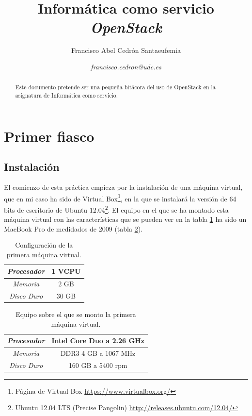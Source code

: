 \documentclass{article}
\title{\textbf{Informática como servicio}
\\ \textbf{\emph{OpenStack}}
}
\author{Francisco Abel Cedrón Santaeufemia \and \textit{francisco.cedron@udc.es}}
\date{} %
\begin{document}
\maketitle %
\renewcommand{\abstractname}{Abstract} %
\begin{abstract}
Este documento pretende ser una pequeña bitácora del uso de OpenStack en la asignatura de Informática como servicio.
\end{abstract}
\renewcommand{\contentsname}{} %
{\setlength{\parskip}{0mm} \tableofcontents} %

\section{Primer fiasco}

\subsection{Instalación}
	El comienzo de esta práctica empieza por la instalación de una máquina virtual, que en mi caso ha sido de Virtual Box\footnote{
	Página de Virtual Box \url{https://www.virtualbox.org/}}, en la que se instalará la versión de 64 bits de escritorio de Ubuntu 12.04\footnote{
	Ubuntu 12.04 LTS (Precise Pangolin) \url{http://releases.ubuntu.com/12.04/}}. El equipo en el que se ha montado esta máquina virtual con las características que se pueden ver en la tabla \ref{tab:VirtualMachine1Settings} ha sido un MacBook Pro de medidados de 2009 (tabla \ref{tab:MacBookProSettings}).

\begin{table}[h]
	\begin{center}
		\caption{Configuración de la primera máquina virtual.}
		\begin{tabular}{|c|c|}
\hline
\emph{Procesador} &
1 VCPU \\ \hline
\emph{Memoria} &
2 GB \\ \hline
\emph{Disco Duro} &
30 GB \\ \hline
		\end{tabular}
		\label{tab:VirtualMachine1Settings}
	\end{center}
\end{table}
	
\begin{table}[h]
	\begin{center}
		\caption{Equipo sobre el que se monto la primera máquina virtual.}
		\begin{tabular}{|c|c|}
\hline
\emph{Procesador} &
Intel Core Duo a 2.26 GHz \\ \hline
\emph{Memoria} &
DDR3 4 GB a 1067 MHz  \\ \hline
\emph{Disco Duro} &
160 GB a 5400 rpm \\ \hline
		\end{tabular}
		\label{tab:MacBookProSettings}
	\end{center}
\end{table}
\end{document}

